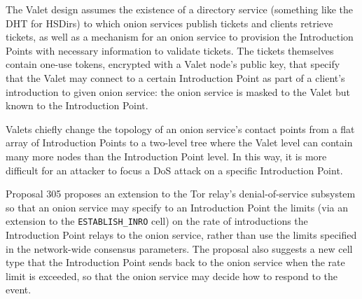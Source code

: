 The Valet design assumes the existence of a directory service (something like the
DHT for HSDirs) to which onion services publish tickets and clients retrieve
tickets, as well as a mechanism for an onion service to provision the
Introduction Points with necessary information to validate tickets.
%
The tickets themselves contain one-use tokens, encrypted with a Valet node's
public key, that specify that the Valet may connect to a certain Introduction
Point as part of a client's introduction to given onion service: the onion service
is masked to the Valet but known to the Introduction Point.


Valets chiefly change the topology of an onion service's contact points from a
flat array of Introduction Points to a two-level tree  where the Valet level
can contain many more nodes than the Introduction Point level.
%
In this way, it is more difficult for an attacker to focus a DoS attack on a
specific Introduction Point.



Proposal 305 proposes an extension to the Tor relay's denial-of-service
subsystem so that an onion service may specify to an Introduction Point the
limits (via an extension to the \texttt{ESTABLISH\_INRO} cell) on the rate of
introductions the Introduction Point relays to the onion service, rather than
use the limits specified in the network-wide consensus parameters.
%
The proposal also suggests a new cell type that the Introduction Point sends
back to the onion service when the rate limit is exceeded, so that the onion
service may decide how to respond to the event.





